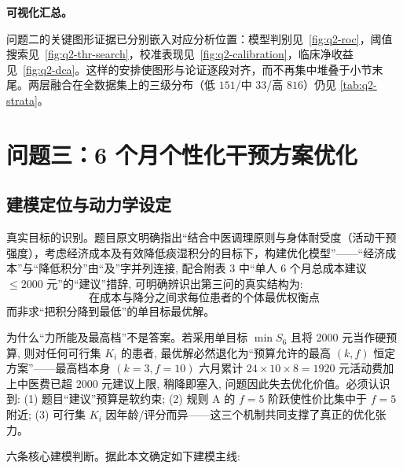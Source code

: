 \documentclass{MathorCupmodeling}
\begin{document}
\noindent\textbf{可视化汇总。}

问题二的关键图形证据已分别嵌入对应分析位置：模型判别见~\cref{fig:q2-roc}，阈值搜索见~\cref{fig:q2-thr-search}，校准表现见~\cref{fig:q2-calibration}，临床净收益见~\cref{fig:q2-dca}。这样的安排使图形与论证逐段对齐，而不再集中堆叠于小节末尾。两层融合在全数据集上的三级分布（低 $151$/中 $33$/高 $816$）仍见 \cref{tab:q2-strata}。

\FloatBarrier

\section{问题三：6 个月个性化干预方案优化}\label{sec:q3}

\subsection{建模定位与动力学设定}

真实目标的识别。题目原文明确指出``结合中医调理原则与身体耐受度（活动干预强度），考虑经济成本及有效降低痰湿积分的目标下，构建优化模型''——``经济成本''与``降低积分''由``及''字并列连接, 配合附表 3 中``单人 6 个月总成本建议$\le 2000$ 元''的``建议''措辞, 可明确辨识出第三问的真实结构为:
\[
\text{在成本与降分之间求每位患者的个体最优权衡点}
\]
而非求``把积分降到最低''的单目标最优解。

为什么``力所能及最高档''不是答案。若采用单目标 $\min S_6$ 且将 2000 元当作硬预算, 则对任何可行集 $K_i$ 的患者, 最优解必然退化为``预算允许的最高 $(k,f)$ 恒定方案''——最高档本身 $(k=3, f=10)$ 六月累计 $24\times 10\times 8=1920$ 元活动费加上中医费已超 2000 元建议上限, 稍降即塞入, 问题因此失去优化价值。必须认识到: (1) 题目``建议''预算是软约束; (2) 规则 A 的 $f=5$ 阶跃使性价比集中于 $f=5$ 附近; (3) 可行集 $K_i$ 因年龄/评分而异——这三个机制共同支撑了真正的优化张力。

六条核心建模判断。据此本文确定如下建模主线:
\end{document}
